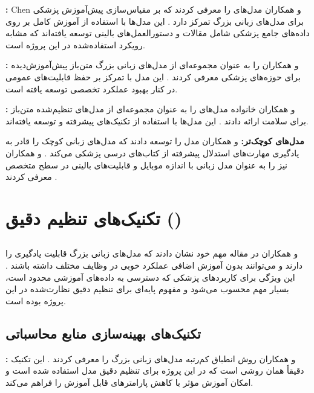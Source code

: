 \documentclass[11pt, a4paper, oneside]{book}
\begin{document}
	\textbf{:} Chen و همکاران مدل‌های  را معرفی کردند که بر مقیاس‌سازی پیش‌آموزش پزشکی برای مدل‌های زبانی بزرگ تمرکز دارد \cite{chen_meditron-70b_2023}. این مدل‌ها با استفاده از آموزش کامل بر روی داده‌های جامع پزشکی شامل مقالات  و دستورالعمل‌های بالینی توسعه یافته‌اند که مشابه رویکرد استفاده‌شده در این پروژه است.

	\textbf{:}  و همکاران  را به عنوان مجموعه‌ای از مدل‌های زبانی بزرگ متن‌باز پیش‌آموزش‌دیده برای حوزه‌های پزشکی معرفی کردند \cite{labrak_biomistral_2024}. این مدل با تمرکز بر حفظ قابلیت‌های عمومی در کنار بهبود عملکرد تخصصی توسعه یافته است.

	\textbf{:}  و همکاران خانواده مدل‌های  را به عنوان مجموعه‌ای از مدل‌های تنظیم‌شده متن‌باز برای سلامت ارائه دادند \cite{gururajan_aloe_2024}. این مدل‌ها با استفاده از تکنیک‌های پیشرفته  و  توسعه یافته‌اند.

	\textbf{مدل‌های کوچک‌تر:}  و همکاران مدل  را توسعه دادند که مدل‌های زبانی کوچک را قادر به یادگیری مهارت‌های استدلال پیشرفته از کتاب‌های درسی پزشکی می‌کند \cite{kim_small_2024}.  و همکاران نیز  را به عنوان مدل زبانی با اندازه موبایل و قابلیت‌های بالینی در سطح متخصص معرفی کردند \cite{vishwanath_medmobile_2024}.

	\section{تکنیک‌های تنظیم دقیق ()}

	\subsection{}

	 و همکاران در مقاله مهم خود نشان دادند که مدل‌های زبانی بزرگ قابلیت یادگیری  را دارند و می‌توانند بدون آموزش اضافی عملکرد خوبی در وظایف مختلف داشته باشند \cite{brown_language_2020}. این ویژگی برای کاربردهای پزشکی که دسترسی به داده‌های آموزشی محدود است، بسیار مهم محسوب می‌شود و مفهوم پایه‌ای برای تنظیم دقیق نظارت‌شده در این پروژه بوده است.

	\subsection{تکنیک‌های بهینه‌سازی منابع محاسباتی}

	\textbf{:}  و همکاران روش انطباق کم‌رتبه مدل‌های زبانی بزرگ را معرفی کردند \cite{hu_lora_2021}. این تکنیک دقیقاً همان روشی است که در این پروژه برای تنظیم دقیق مدل  استفاده شده است و امکان آموزش مؤثر با کاهش پارامترهای قابل آموزش را فراهم می‌کند.
\end{document}
